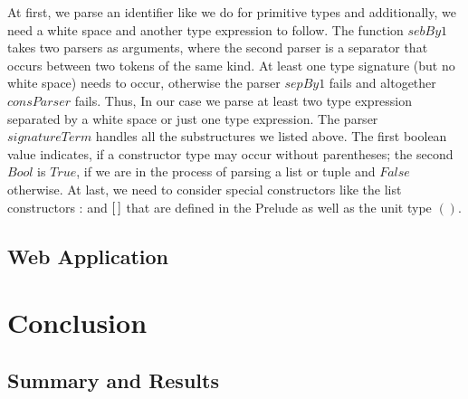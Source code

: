 \documentclass[%
	pdftex,%
	a4paper,%
	oneside,%
	chapterprefix,%
	headsepline,%
	12pt%
]{scrbook}
\newcommand{\Conid}[1]{\mathit{#1}}
\newcommand{\Varid}[1]{\mathit{#1}}
\begin{document}
At first, we parse an identifier like we do for primitive types and
additionally, we need a white space and another type expression to
follow. %
The function \ensuremath{\Varid{sebBy1}} takes two parsers as arguments, where the second
parser is a separator that occurs between two tokens of the same
kind. %
At least one type signature (but no white space) needs to occur,
otherwise the parser \ensuremath{\Varid{sepBy1}} fails and altogether \ensuremath{\Varid{consParser}}
fails. %
Thus, In our case we parse at least two type expression separated by a
white space or just one type expression. %
The parser \ensuremath{\Varid{signatureTerm}} handles all the substructures we listed
above. %
The first boolean value indicates, if a constructor type may occur
without parentheses; the second \ensuremath{\Conid{Bool}} is \ensuremath{\Conid{True}}, if we are in the
process of parsing a list or tuple and \ensuremath{\Conid{False}} otherwise. %
At last, we need to consider special constructors like the list
constructors \ensuremath{\mathbin{:}} and \ensuremath{[\mskip1.5mu \mskip1.5mu]} that are defined in the Prelude as well as
the unit type \ensuremath{()}. %





\section{Web Application}
\chapter{Conclusion}\label{conclusion}
\section{Summary and Results}
\end{document}
